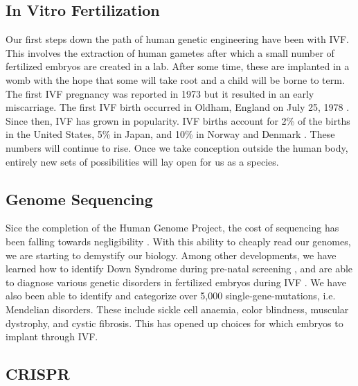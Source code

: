 \subsection{In Vitro Fertilization}

Our first steps down the path of human genetic engineering have been with IVF.
This involves the extraction of human gametes after which a small number of fertilized embryos are created in a lab.
After some time, these are implanted in a womb with the hope that some will take root and a child will be borne to term.
The first IVF pregnancy was reported in 1973 \cite{Kretzer1973} but it resulted in an early miscarriage.
The first IVF birth occurred in Oldham, England on July 25, 1978 \cite{Steptoe1978}.
Since then, IVF has grown in popularity.
IVF births account for 2\% of the births in the United States, 5\% in Japan, and 10\% in Norway and Denmark \cite{Metzl2019}.
These numbers will continue to rise.
Once we take conception outside the human body, entirely new sets of possibilities will lay open for us as a species.

\subsection{Genome Sequencing}

Sice the completion of the Human Genome Project, the cost of sequencing has been falling towards negligibility \cite{Wetterstrand2019}.
With this ability to cheaply read our genomes, we are starting to demystify our biology.
Among other developments, we have learned how to identify Down Syndrome during pre-natal screening \cite{Natoli2012}, and are able to diagnose various genetic disorders in fertilized embryos during IVF \cite{Rycke2017}.
We have also been able to identify and categorize over 5,000 single-gene-mutations, i.e. Mendelian disorders.
These include sickle cell anaemia, color blindness, muscular dystrophy, and cystic fibrosis.
This has opened up choices for which embryos to implant through IVF.

\subsection{CRISPR}

